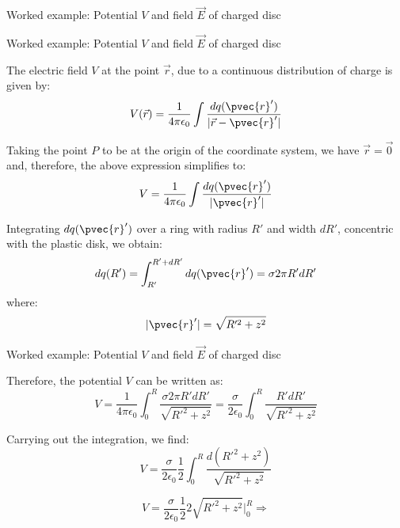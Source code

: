 {\begin{frame}{Worked example: Potential $V$ and field $\vec{E}$ of charged disc}
\end{frame}

%
%
%

\begin{frame}{Worked example: Potential $V$ and field $\vec{E}$ of charged disc}

  The electric field $V$ at the point $\vec{r}$, due to a continuous
  distribution of charge is given by:
  \begin{equation*}
    V(\vec{r}) = \frac{1}{4\pi\epsilon_0}
     \int \frac{dq(\pvec{r}')}{|\vec{r}-\pvec{r}'|}
  \end{equation*}

  Taking the point $P$ to be at the origin of the coordinate system,
  we have $\vec{r}=\vec{0}$ and, therefore, the above expression simplifies to:
  \begin{equation*}
    V = \frac{1}{4\pi\epsilon_0}
     \int \frac{dq(\pvec{r}')}{|\pvec{r}'|}
  \end{equation*}

  Integrating $dq(\pvec{r}')$ over a ring with radius $R'$ and width $dR'$,
  concentric with the plastic disk, we obtain:
  \begin{equation*}
    dq(R') = \int_{R'}^{R'+dR'} dq(\pvec{r}') = \sigma 2\pi R' dR'
  \end{equation*}
  where:
  \begin{equation*}
    |\pvec{r}'| = \sqrt{R'^2+z^2}
  \end{equation*}

\end{frame}

%
%
%

\begin{frame}{Worked example: Potential $V$ and field $\vec{E}$ of charged disc}

  Therefore, the potential $V$ can be written as:
  \begin{equation*}
    V =
     \frac{1}{4\pi\epsilon_0}
       \int_{0}^{R} \frac{\sigma 2\pi R' dR'}{\sqrt{R'^2+z^2}} =
     \frac{\sigma}{2\epsilon_0}
       \int_{0}^{R} \frac{R' dR'}{\sqrt{R'^2+z^2}}
  \end{equation*}

  Carrying out the integration, we find:
  \begin{equation*}
    V =
     \frac{\sigma}{2\epsilon_0}
       \frac{1}{2} \int_{0}^{R} \frac{d(R'^2+z^2)}{\sqrt{R'^2+z^2}}
  \end{equation*}

  \begin{equation*}
    V =
     \frac{\sigma}{2\epsilon_0}
       \frac{1}{2} 2 \sqrt{R'^2+z^2}\Big\rvert_{0}^{R} \Rightarrow
  \end{equation*}


\end{frame}}
